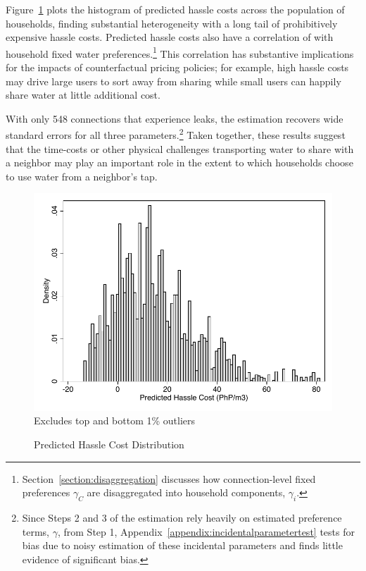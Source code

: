 \documentclass[12pt]{article}
\begin{document}
Figure~\ref{figure:step2histogram} plots the histogram of predicted hassle costs across the population of households, finding substantial heterogeneity with a long tail of prohibitively expensive hassle costs.  Predicted hassle costs also have a correlation of  with household fixed water preferences.\footnote{Section~\ref{section:disaggregation} discusses how connection-level fixed preferences $\gamma_C$ are disaggregated into household components, $\gamma_i$.}  This correlation has substantive implications for the impacts of counterfactual pricing policies; for example, high hassle costs may drive large users to sort away from sharing while small users can happily share water at little additional cost.

With only 548 connections that experience leaks, the estimation recovers wide standard errors for all three parameters.\footnote{Since Steps 2 and 3 of the estimation rely heavily on estimated preference terms, $\gamma$, from Step 1, Appendix~\ref{appendix:incidentalparametertest} tests for bias due to noisy estimation of these incidental parameters and finds little evidence of significant bias.}  Taken together, these results suggest that the time-costs or other physical challenges transporting water to share with a neighbor may play an important role in the extent to which households choose to use water from a neighbor's tap.


\begin{figure}
\centering
\caption{Predicted Hassle Cost Distribution}\label{figure:step2histogram}
\includegraphics[scale=.7]{tables/hassle_cost_distribution.pdf} \\
\footnotesize{Excludes top and bottom 1\% outliers}
\end{figure}
\end{document}
